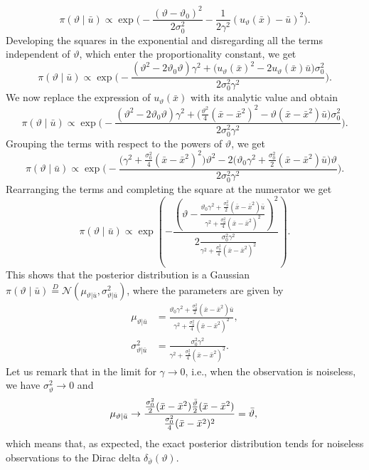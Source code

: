\documentclass{siamart1116}
\numberwithin{theorem}{section}
\renewcommand{\theta}{\vartheta}
\newcommand{\eqtext}[1]{\ensuremath{\stackrel{#1}{=}}}
\begin{document}
\begin{equation}
	\pi(\theta \mid \bar u) \propto \exp\Big(-\frac{(\theta - \theta_0)^2}{2\sigma_0^2} - \frac{1}{2\gamma^2}(u_\theta(\bar x) - \bar u )^2 \Big).
\end{equation}
Developing the squares in the exponential and disregarding all the terms independent of $\theta$, which enter the proportionality constant, we get
\begin{equation}
	\pi(\theta \mid \bar u) \propto \exp\Big(-\frac{(\theta^2 - 2\theta_0\theta)\gamma^2 + \big(u_\theta(\bar x)^2 - 2u_\theta(\bar x)\bar u\big)\sigma_0^2 }{2\sigma_0^2\gamma^2}\Big).
\end{equation}
We now replace the expression of $u_\theta(\bar x)$ with its analytic value and obtain
\begin{equation}
	\pi(\theta \mid \bar u) \propto \exp\Bigg(-\frac{(\theta^2 - 2\theta_0\theta)\gamma^2 + \big(\frac{\theta^2}{4}(\bar x - \bar x^2)^2 - \theta(\bar x - \bar x^2)\bar u\big)\sigma_0^2 }{2\sigma_0^2\gamma^2}\Bigg).
\end{equation}
Grouping the terms with respect to the powers of $\theta$, we get
\begin{equation}
	\pi(\theta \mid \bar u) \propto \exp\Bigg(-\frac{\big(\gamma^2 + \frac{\sigma_0^2}{4}(\bar x - \bar x^2)^2\big)\theta^2 - 2\big(\theta_0 \gamma^2 + \frac{\sigma_0^2}{2}(\bar x - \bar x^2)\bar u\big)\theta}{2\sigma_0^2\gamma^2}\Bigg).
\end{equation}
Rearranging the terms and completing the square at the numerator we get
\begin{equation}
	\pi(\theta \mid \bar u) \propto \exp\left(-\frac{\left(\theta - \frac{\theta_0 \gamma^2 + \frac{\sigma_0^2}{2}(\bar x - \bar x^2)\bar u}{\gamma^2 + \frac{\sigma_0^2}{4}(\bar x - \bar x^2)^2}\right)^2}{2\frac{\sigma_0^2\gamma^2}{\gamma^2 + \frac{\sigma_0^2}{4}(\bar x - \bar x^2)^2}}\right).
\end{equation}
This shows that the posterior distribution is a Gaussian $\pi(\theta \mid \bar u) \eqtext{D} \mathcal{N}(\mu_{\theta|\bar u}, \sigma^2_{\theta|\bar u})$, where the parameters are given by
\begin{equation}
\begin{aligned}
	\mu_{\theta|\bar u} &= \frac{\theta_0 \gamma^2 + \frac{\sigma_0^2}{2}(\bar x - \bar x^2)\bar u}{\gamma^2 + \frac{\sigma_0^2}{4}(\bar x - \bar x^2)^2}, \\
	\sigma^2_{\theta|\bar u} &= \frac{\sigma_0^2\gamma^2}{\gamma^2 + \frac{\sigma_0^2}{4}(\bar x - \bar x^2)^2}.
\end{aligned}
\end{equation}
Let us remark that in the limit for $\gamma \to 0$, i.e., when the observation is noiseless, we have $\sigma^2_\theta \to 0$ and 
\begin{equation}
	\mu_{\theta|\bar u} \to \frac{\frac{\sigma_0^2}{2}(\bar x - \bar x^2)\frac{\bar \theta}{2}(\bar x - \bar x^2)}{\frac{\sigma_0^2}{4}(\bar x - \bar x^2)^2} = \bar \theta, \\
\end{equation}
which means that, as expected, the exact posterior distribution tends for noiseless observations to the Dirac delta $\delta_{\bar \theta}(\theta)$.
\end{document}
